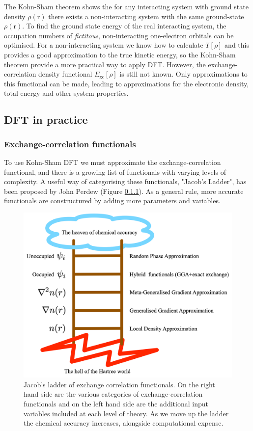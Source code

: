 The Kohn-Sham theorem shows the for any interacting system with ground state density $\rho(\textrm{r})$ there exists a non-interacting system with the same ground-state $\rho(\textrm{r})$. To find the ground state energy of the real interacting system, the occupation numbers of \textit{fictitous}, non-interacting one-electron orbitals can be optimised. For a non-interacting system we know how to calculate $T\left[\rho\right]$ and this provides a good approximation to the true kinetic energy, so the Kohn-Sham theorem provide a more practical way to apply DFT. However, the exchange-correlation density functional $E_{\textrm{xc}}\left[\rho\right]$ is still not known. Only approximations to this functional can be made, leading to approximations for the electronic density, total energy and other system properties.


\subsection{DFT in practice}

\subsubsection{Exchange-correlation functionals}
To use Kohn-Sham DFT we must approximate the exchange-correlation functional, and there is a growing list of functionals with varying levels of complexity. A useful way of categorising these functionals, "Jacob's Ladder", has been proposed by John Perdew (Figure \ref{}). As a general rule, more accurate functionals are constructured by adding more parameters and variables.

\begin{figure}[h]
\centering
  \includegraphics[resolution=450]{figures/ch3/jladder.png}
  \caption[Jacob's ladder of exchange-correlation functionals]{Jacob's ladder of exchange correlation functionals. On the right hand side are the various categories of exchange-correlation functionals and on the left hand side are the additional input variables included at each level of theory. As we move up the ladder the chemical accuracy increases, alongside computational expense.}
  \label{decouple}
\end{figure}

